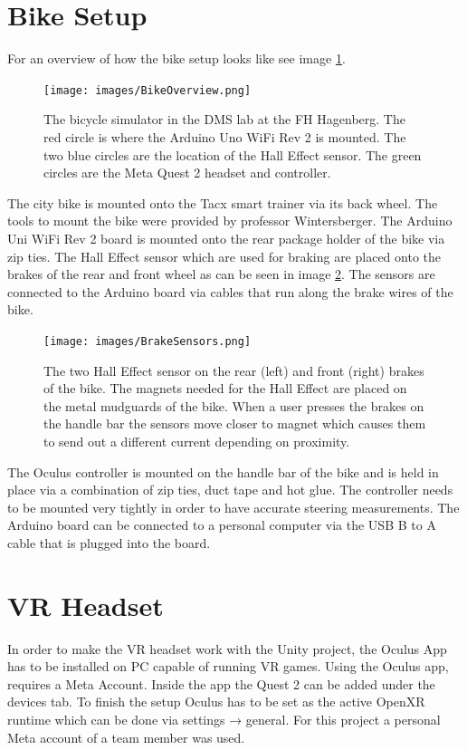 \documentclass[english,notitlepage,smartquotes]{hgbreport}
\begin{document}
\section{Bike Setup}
For an overview of how the bike setup looks like see image \ref{fig:bikeOver}.
\begin{figure}[htbp]
    \centering\small
    {\texttt{[image: images/BikeOverview.png]}}
    \caption{The bicycle simulator in the DMS lab at the FH Hagenberg. The red circle is where the Arduino Uno WiFi Rev 2 is mounted. The two blue circles are the location of the Hall Effect sensor. The green circles are the Meta Quest 2 headset and controller.}
    \label{fig:bikeOver}
\end{figure}
The city bike is mounted onto the Tacx smart trainer via its back wheel. The tools to mount the bike were provided by professor Wintersberger. 
The Arduino Uni WiFi Rev 2 board is mounted onto the rear package holder of the bike via zip ties.
The Hall Effect sensor which are used for braking are placed onto the brakes of the rear and front wheel as can be seen in image \ref{fig:brakesSens}. 
The sensors are connected to the Arduino board via cables that run along the brake wires of the bike.
\begin{figure}[htbp]
    \centering\small
    {\texttt{[image: images/BrakeSensors.png]}}
    \caption{The two Hall Effect sensor on the rear (left) and front (right) brakes of the bike. The magnets needed for the Hall Effect are placed on the metal mudguards of the bike. When a user presses the brakes on the handle bar the sensors move closer to magnet which causes them to send out a different current depending on proximity.}
    \label{fig:brakesSens}
\end{figure}
The Oculus controller is mounted on the handle bar of the bike and is held in place via a combination of zip ties, duct tape and hot glue. The controller needs to be mounted very tightly in order to have accurate steering measurements.
The Arduino board can be connected to a personal computer via the USB B to A cable that is plugged into the board.

\section{VR Headset}
In order to make the VR headset work with the Unity project, the Oculus App \cite{OculusApp2023} has to be installed on PC capable of running VR games.
Using the Oculus app, requires a Meta Account. Inside the app the Quest 2 can be added under the devices tab.
To finish the setup Oculus has to be set as the active OpenXR runtime which can be done via settings → general.
For this project a personal Meta account of a team member was used.
\end{document}
